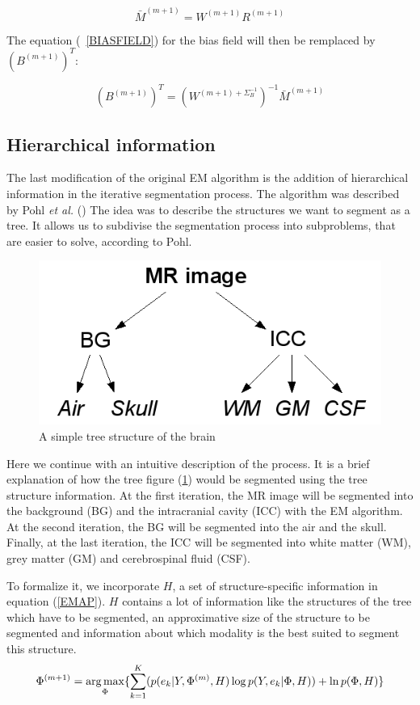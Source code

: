   \begin{equation*}
  \bar{M}^{(m+1)} = W^{(m+1)}R^{(m+1)}
  \end{equation*}

The equation (~\ref{BIASFIELD}) for the bias field will then be remplaced by $(B^{(m+1)})^T$:

  \begin{equation*}
  (B^{(m+1)})^T = (W^{(m+1) + \Sigma_B^{-1}})^{-1}\bar{M}^{(m+1)}
  \end{equation*}

%
\subsection{Hierarchical information}\label{Structure}
The last modification of the original EM algorithm is the addition of hierarchical information in the iterative segmentation process. The algorithm was described by Pohl \textit{et al.} (\cite{11}) The idea was to describe the structures we want to segment as a tree. It allows us to subdivise the segmentation process into subproblems, that are easier to solve, according to Pohl.
  
  \begin{figure}[ht]\centering
  \includegraphics[width=.4\textwidth]{Images/Graphics/treeStructure.png}
  \caption{A simple tree structure of the brain}\label{fig:treeStructure}
  \end{figure}
  
Here we continue with an intuitive description of the process. It is a brief explanation of how the tree figure (\ref{fig:treeStructure}) would be segmented using the tree structure information. At the first iteration, the MR image will be segmented into the background (BG) and the intracranial cavity (ICC) with the EM algorithm. At the second iteration, the BG will be segmented into the air and the skull. Finally, at the last iteration, the ICC will be segmented into white matter (WM), grey matter (GM) and cerebrospinal fluid (CSF).

To formalize it, we incorporate $H$, a set of structure-specific information in equation (\ref{EMAP}). $H$ contains a lot of information like the structures of the tree which have to be segmented, an approximative size of the structure to be segmented and information about which modality is the best suited to segment this structure.
\begin{equation*}
 \Phi^{(m+1)}=\operatorname*{arg\,max}_\Phi \{\sum_{k=1}^K   (p(e_{k}|Y,\Phi^{(m)},H)\operatorname*{log} p(Y,e_{k}|\Phi,H)) + \operatorname*{ln} p(\Phi ,H) \} \\
\end{equation*}
 
